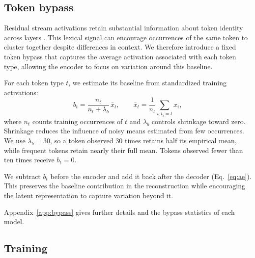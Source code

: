 \documentclass[11pt]{article}
\begin{document}


\subsection{Token bypass}
\label{sec:bypass}

Residual stream activations retain substantial information
about token identity across layers
\citep{rizwan2026persistent}.
This lexical signal can encourage occurrences of the same
token to cluster together despite differences in context.
We therefore introduce a fixed token bypass that captures
the average activation associated with each token type,
allowing the encoder to focus on variation around this
baseline.

For each token type $t$, we estimate its baseline from
standardized training activations:
\begin{equation}
  b_t = \frac{n_t}{n_t+\lambda_b}\,\bar{x}_t,
  \qquad
  \bar{x}_t = \frac{1}{n_t}\sum_{i:t_i=t} x_i,
  \label{eq:bypass}
\end{equation}
where $n_t$ counts training occurrences of $t$ and
$\lambda_b$ controls shrinkage toward zero.
Shrinkage reduces the influence of noisy means estimated
from few occurrences.
We use $\lambda_b=30$, so a token observed 30 times retains
half its empirical mean, while frequent tokens retain
nearly their full mean.
Tokens observed fewer than ten times receive $b_t=0$.

We subtract $b_t$ before the encoder and add it back after
the decoder (Eq.~\ref{eq:ae}).
This preserves the baseline contribution in the reconstruction
while encouraging the latent representation to capture
variation beyond it.

Appendix~\ref{app:bypass} gives further details and the bypass statistics of each model.

\subsection{Training}
\label{sec:training}
\end{document}
